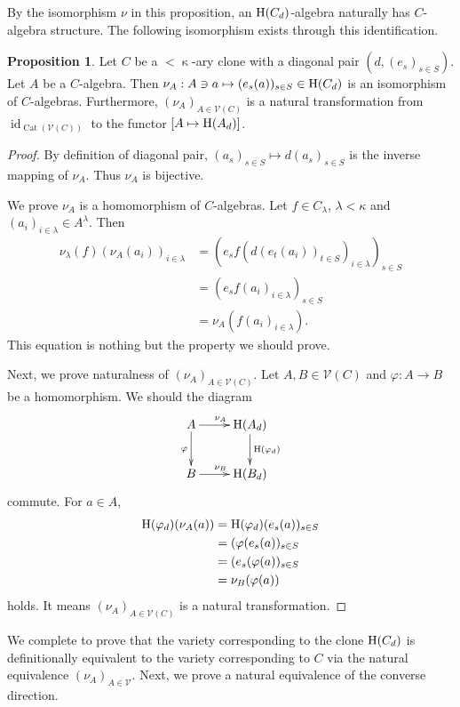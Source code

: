 \documentclass[a4paper,10pt]{article}
\theoremstyle{definition}
\newtheorem{prop}[df]{Proposition}
\newcommand\ph{\varphi}
\newcommand\ra{\rightarrow}
\DeclareMathOperator{\id}{id}
\newcommand\mc{\mathclose}
\newcommand\V{\mathcal{V}}
\DeclareMathOperator{\Cat}{Cat}
\begin{document}
By the isomorphism $\nu$ in this proposition, an ${\rm H}(C_d)$-algebra naturally has 
$C$-algebra structure.
The following isomorphism exists through this identification.
\begin{prop}\label{equiv-single}
Let $C$ be a $<\mc\kappa$-ary clone with a diagonal pair $(d,(e_s)_{s\in S})$.
Let $A$ be a $C$-algebra. Then $\nu_A:A\ni a\mapsto (e_s(a))_{s\in S}\in {\rm H}(C_d)$
is an isomorphism of $C$-algebras.
Furthermore, $(\nu_A)_{A\in\V(C)}$ is a natural transformation
from $\id_{\Cat(\V(C))}$ to the functor $[A\mapsto {\rm H}(A_d)]$.
\end{prop}
\begin{proof}
By definition of diagonal pair, $(a_s)_{s\in S}\mapsto d(a_s)_{s\in S}$ is 
the inverse mapping of $\nu_A$. Thus $\nu_A$ is bijective.

We prove $\nu_A$ is a homomorphism of $C$-algebras.
Let $f\in C_\lambda$, $\lambda<\kappa$ and $(a_i)_{i\in\lambda}\in A^\lambda$.
Then
\begin{align*}
\nu_\lambda(f)(\nu_A(a_i))_{i\in\lambda}
&=(e_sf(d(e_t(a_i))_{t\in S})_{i\in\lambda})_{s\in S}\\
&=(e_sf(a_i)_{i\in\lambda})_{s\in S}\\
&=\nu_A(f(a_i)_{i\in\lambda}).
\end{align*}
This equation is nothing but the property we should prove.

Next, we prove naturalness of $(\nu_A)_{A\in\V(C)}$.
Let $A,B\in\V(C)$ and $\ph:A\ra B$ be a homomorphism.
We should the diagram
\[\xymatrix{
A\ar[r]^{\nu_A} \ar[d]_\ph& {\rm H}(A_d)\ar[d]^{{\rm H}(\ph_d)}\\
B\ar[r]^{\nu_B} & {\rm H}(B_d)
}\]
commute. For $a\in A$,
\begin{align*}
{\rm H}(\ph_d)(\nu_A(a))
&={\rm H}(\ph_d)(e_s(a))_{s\in S}\\
&=(\ph(e_s(a))_{s\in S}\\
&=(e_s(\ph(a))_{s\in S}\\
&=\nu_B(\ph(a))
\end{align*}
holds. It means $(\nu_A)_{A\in\V(C)}$ is a natural transformation.
\end{proof}

We complete to prove that
the variety corresponding to the clone ${\rm H}(C_d)$ is definitionally
equivalent to the variety corresponding to $C$ via the natural equivalence $(\nu_A)_{A\in\V}$.
Next, we prove a natural equivalence of the converse direction.
\end{document}
